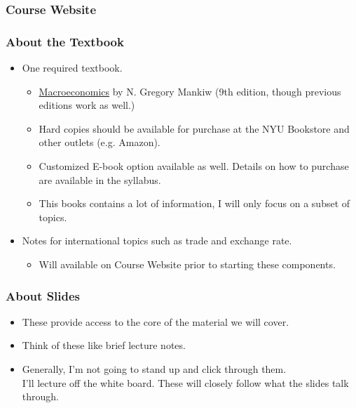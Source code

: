 \documentclass[9pt]{beamer}
\begin{document}

\begin{frame}[t]
\frametitle{Course Website}
\bigskip
\bigskip
\end{frame}


\begin{frame}[t]
\frametitle{About the Textbook}
\begin{itemize}
\item One required textbook.
\begin{itemize}
\medskip
\item \href{http://www.amazon.com/Macroeconomics-N-Gregory-Mankiw/dp/1429240024}{Macroeconomics} by N. Gregory Mankiw (9th edition, though previous editions work as well.)
    \medskip
\item Hard copies should be available for purchase at the NYU Bookstore and other outlets (e.g. Amazon).
    \medskip
\item Customized E-book option available as well. Details on how to purchase are available in the syllabus.
\medskip
\item This books contains a lot of information, I will only focus on a subset of topics.
\end{itemize}
\bigskip
\item Notes for international topics such as trade and exchange rate.
\begin{itemize}
\medskip
\item Will available on Course Website prior to starting these components.
\end{itemize}
\end{itemize}
\end{frame}



\begin{frame}[t]
\frametitle{About Slides}
\begin{itemize}
\item These provide access to the core of the material we will cover.
\bigskip
\item Think of these like brief lecture notes.
\bigskip
\item Generally, I'm not going to stand up and click through them.\\
\bigskip
 I'll lecture off the white board. These will closely follow what the slides talk through.
\end{itemize}
\end{frame}
\end{document}
